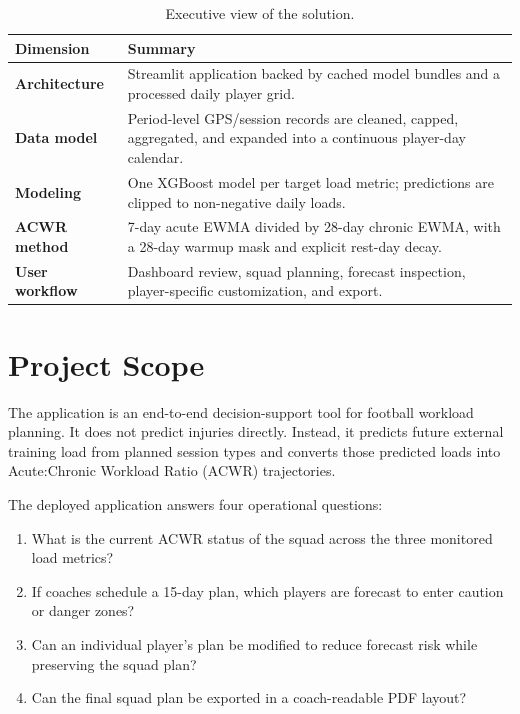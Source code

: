 \documentclass[11pt,a4paper]{article}
\newcommand{\tablehead}[1]{\textcolor{rmblue}{\textbf{#1}}}
\begin{document}
\vspace{0.8em}
\begin{table}[H]
\centering
\caption{Executive view of the solution.}
\begin{tabularx}{\textwidth}{L{3.5cm}Y}
\toprule
{}
\tablehead{Dimension} & \tablehead{Summary} \\
\midrule
\textbf{Architecture} & Streamlit application backed by cached model bundles and a processed daily player grid. \\
\textbf{Data model} & Period-level GPS/session records are cleaned, capped, aggregated, and expanded into a continuous player-day calendar. \\
\textbf{Modeling} & One XGBoost model per target load metric; predictions are clipped to non-negative daily loads. \\
\textbf{ACWR method} & 7-day acute EWMA divided by 28-day chronic EWMA, with a 28-day warmup mask and explicit rest-day decay. \\
\textbf{User workflow} & Dashboard review, squad planning, forecast inspection, player-specific customization, and export. \\
\bottomrule
\end{tabularx}
\end{table}

\clearpage
\begingroup
\small
\setlength{\parskip}{0.15em}
\tableofcontents
\endgroup
\clearpage
{}
\pagestyle{fancy}

\section{Project Scope}

The application is an end-to-end decision-support tool for football workload planning. It does not predict injuries directly. Instead, it predicts future external training load from planned session types and converts those predicted loads into Acute:Chronic Workload Ratio (ACWR) trajectories.

The deployed application answers four operational questions:
\begin{enumerate}
  \item What is the current ACWR status of the squad across the three monitored load metrics?
  \item If coaches schedule a 15-day plan, which players are forecast to enter caution or danger zones?
  \item Can an individual player's plan be modified to reduce forecast risk while preserving the squad plan?
  \item Can the final squad plan be exported in a coach-readable PDF layout?
\end{enumerate}
\end{document}
